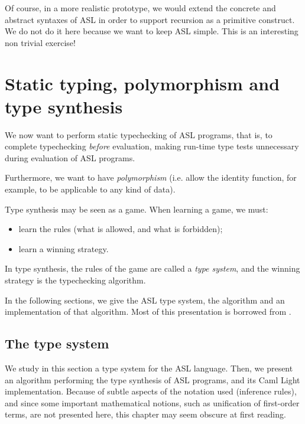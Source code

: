 Of course, in a more realistic prototype, we would extend the concrete
and abstract syntaxes of ASL in order to support recursion as a
primitive construct. We do not do it here because we want to keep ASL
simple.  This is an interesting non trivial exercise!

\chapter{Static typing, polymorphism and type synthesis}
\label{c:ASLtyping}
%

We now want to perform static typechecking of ASL programs, that is,
to complete typechecking {\em before} evaluation, making run-time type
tests unnecessary during evaluation of ASL programs.

Furthermore, we want to have {\em polymorphism} (i.e. allow the
identity function, for example, to be applicable to any kind of data).

Type synthesis may be seen as a game. When learning a game, we must:
\begin{itemize}
\item learn the rules (what is allowed, and what is forbidden);
\item learn a winning strategy.
\end{itemize}

In type synthesis, the rules of the game are called a {\em type
system}, and the winning strategy is the typechecking algorithm.

In the following sections, we give the ASL type system, the algorithm
and an implementation of that algorithm. Most of this presentation is
borrowed from
\cite{MiniML}.

\section{The type system}

We study in this section a type system for the ASL language. Then, we
present an algorithm performing the type synthesis of ASL programs,
and its Caml Light implementation. Because of subtle aspects of the
notation used (inference rules), and since some important mathematical
notions, such as unification of first-order terms, are not presented
here, this chapter may seem obscure at first reading.

